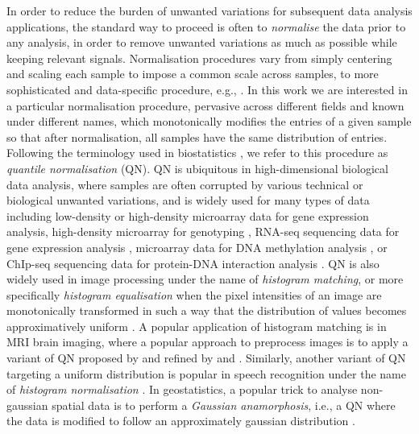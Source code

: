 \documentclass{article}
\begin{document}
In order to reduce the burden of unwanted variations for subsequent data analysis applications, the standard way to proceed is often to \emph{normalise} the data prior to any analysis, in order to remove unwanted variations as much as possible while keeping relevant signals. Normalisation procedures vary from simply centering and scaling each sample to impose a common scale across samples, to more sophisticated and data-specific procedure, e.g., \cite{Bullard2010Evaluation}. In this work we are interested in a particular normalisation procedure, pervasive across different fields and known under different names, which monotonically modifies the entries of a given sample so that after normalisation, all samples have the same distribution of entries. Following the terminology used in biostatistics \cite{Hicks2015quantro}, we refer to this procedure as \emph{quantile normalisation} (QN). QN is ubiquitous in high-dimensional biological data analysis, where samples are often corrupted by various technical or biological unwanted variations, and is widely used for many types of data including low-density \cite{Amaratunga2001Analysis,Yang2003Statistics} or high-density \cite{Bolstad2003comparison,Irizarry2003Exploration} microarray data for gene expression analysis, high-density microarray for genotyping \cite{Carvalho2007Exploration,Scharpf2011Using}, RNA-seq sequencing data for gene expression analysis \cite{Cloonan2008Stem,Bullard2010Evaluation,Dillies2013comprehensive}, microarray data for DNA methylation analysis \cite{Yousefi2013Considerations}, or ChIp-seq sequencing data for protein-DNA interaction analysis \cite{Bilodeau2009SetDB1,Kasowski2010Variation}. QN is also widely used in image processing under the name of \emph{histogram matching}, or more specifically \emph{histogram equalisation} when the pixel intensities of an image are monotonically transformed in such a way that the distribution of values becomes approximatively uniform \cite{Gonzalez2008Digital}. A popular application of histogram matching is in MRI brain imaging, where a popular approach to preprocess images is to apply a variant of QN proposed by \cite{Nyul1999standardizing} and refined by \cite{Nyul2000New} and \cite{Shah2011Evaluating}. Similarly, another variant of QN targeting a uniform distribution is popular in speech recognition under the name of \emph{histogram normalisation} \cite{Dharanipragada2000nonlinear,Molau2001Histogram,Hilger2006Quantile}. In geostatistics, a popular trick to analyse non-gaussian spatial data is to perform a \emph{Gaussian anamorphosis}, i.e., a QN where the data is modified to follow an approximately gaussian distribution \cite{Chiles2012Geostatistics}.
\end{document}
